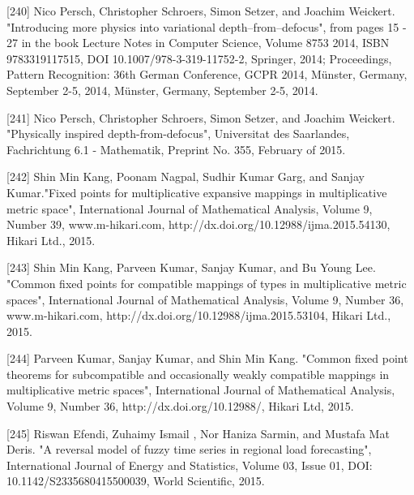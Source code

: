 \documentclass[12pt]{article}
\begin{document}
[240] Nico Persch, Christopher Schroers, Simon Setzer, and Joachim Weickert. "Introducing more physics into variational depth–from–defocus", from pages 15 - 27 in the book Lecture Notes in Computer Science, Volume 8753 2014, ISBN 9783319117515, DOI 10.1007/978-3-319-11752-2, Springer, 2014; Proceedings, Pattern Recognition: 36th German Conference, GCPR 2014, Münster, Germany, September 2-5, 2014, Münster, Germany, September 2-5, 2014.

[241] Nico Persch, Christopher Schroers, Simon Setzer, and Joachim Weickert. "Physically inspired depth-from-defocus", Universitat des Saarlandes, Fachrichtung 6.1 - Mathematik, Preprint No. 355, February of 2015.

[242] Shin Min Kang, Poonam Nagpal, Sudhir Kumar Garg, and Sanjay Kumar."Fixed points for multiplicative expansive mappings in multiplicative metric space", International Journal of Mathematical Analysis, Volume 9, Number 39, www.m-hikari.com, http://dx.doi.org/10.12988/ijma.2015.54130, Hikari Ltd., 2015.

[243] Shin Min Kang, Parveen Kumar, Sanjay Kumar, and Bu Young Lee. "Common fixed points for compatible mappings of types in multiplicative metric spaces", International Journal of Mathematical Analysis, Volume 9, Number 36, www.m-hikari.com, http://dx.doi.org/10.12988/ijma.2015.53104, Hikari Ltd., 2015.

[244] Parveen Kumar, Sanjay Kumar, and Shin Min Kang. "Common fixed point theorems for subcompatible and occasionally weakly compatible mappings in multiplicative metric spaces", International Journal of Mathematical Analysis, Volume 9, Number 36, http://dx.doi.org/10.12988/, Hikari Ltd, 2015.

[245] Riswan Efendi, Zuhaimy Ismail , Nor Haniza Sarmin, and Mustafa Mat Deris. "A reversal model of fuzzy time series in regional load forecasting", International Journal of Energy and Statistics, Volume 03, Issue 01, DOI: 10.1142/S2335680415500039, World Scientific, 2015.
\end{document}
